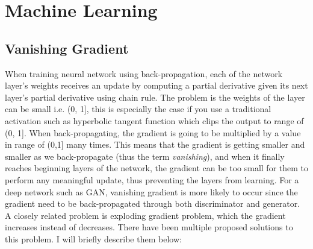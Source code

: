 {}

\appendix
\chapter{Machine Learning}
\label{app:ml}

\section{Vanishing Gradient}
\label{app:ml:van_grad}
When training neural network using back-propagation, each of the network layer's weights receives an update by computing a partial derivative given its next layer's partial derivative using chain rule. The problem is the weights of the layer can be small i.e. (0, 1], this is especially the case if you use a traditional activation such as hyperbolic tangent function which clips the output to range of (0, 1]. When back-propagating, the gradient is going to be multiplied by a value in range of (0,1] many times. This means that the gradient is getting smaller and smaller as we back-propagate (thus the term \textit{vanishing}), and when it finally reaches beginning layers of the network, the gradient can be too small for them to perform any meaningful update, thus preventing the layers from learning. For a deep network such as GAN, vanishing gradient is more likely to occur since the gradient need to be back-propagated through both discriminator and generator. A closely related problem is exploding gradient problem, which the gradient increases instead of decreases. There have been multiple proposed solutions to this problem. I will briefly describe them below:

